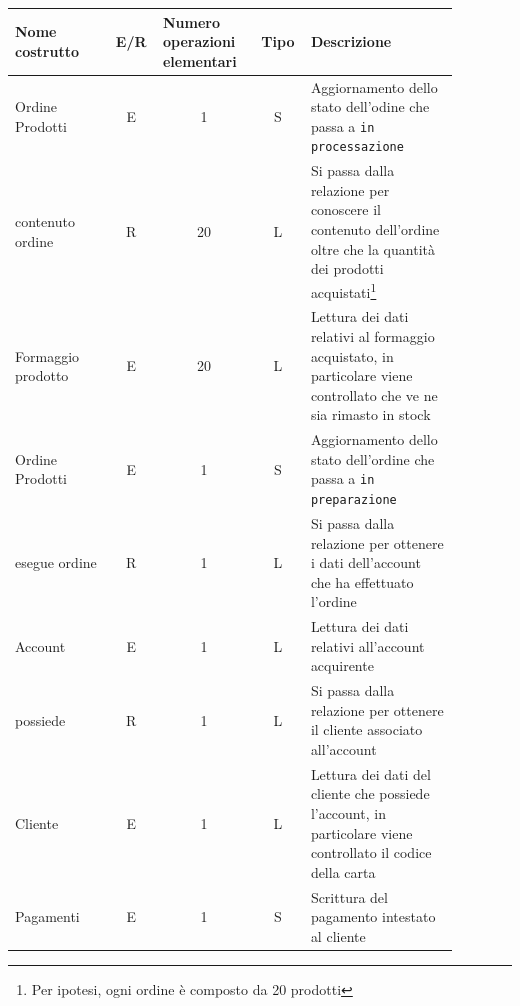 \documentclass[12pt,a4paper]{article}
\begin{document}
\begin{center}\setlength{\extrarowheight}{1.5pt}\begin{longtable}{|p{0.2\linewidth}|p{0.1\linewidth}|p{0.175\linewidth}|p{0.1\linewidth}|p{0.3\linewidth}|}\hline \textbf{Nome costrutto}   & \multicolumn{1}{|c|}{\textbf{E/R}} & \textbf{Numero operazioni elementari} & \multicolumn{1}{|c|}{\textbf{Tipo}} & \textbf{Descrizione}\\ 
\hline
Ordine Prodotti
 & 
\multicolumn{1}{|c|}{E}
 & 
\multicolumn{1}{|c|}{1}
 & 
\multicolumn{1}{|c|}{S}
 & 
Aggiornamento dello stato dell'odine che passa a \texttt{in processazione}
\\
\hline
contenuto ordine
 & 
\multicolumn{1}{|c|}{R}
 & 
\multicolumn{1}{|c|}{20}
 & 
\multicolumn{1}{|c|}{L}
 & 
Si passa dalla relazione per conoscere il contenuto dell'ordine oltre che la quantità dei prodotti acquistati\footnote{Per ipotesi, ogni ordine è composto da 20 prodotti}
\\
\hline
Formaggio prodotto
 & 
\multicolumn{1}{|c|}{E}
 & 
\multicolumn{1}{|c|}{20}
 & 
\multicolumn{1}{|c|}{L}
 & 
Lettura dei dati relativi al formaggio acquistato, in particolare viene controllato che ve ne sia rimasto in stock
\\
\hline
Ordine Prodotti
 & 
\multicolumn{1}{|c|}{E}
 & 
\multicolumn{1}{|c|}{1}
 & 
\multicolumn{1}{|c|}{S}
 & 
Aggiornamento dello stato dell'ordine che passa a \texttt{in preparazione}
\\
\hline
esegue ordine
 & 
\multicolumn{1}{|c|}{R}
 & 
\multicolumn{1}{|c|}{1}
 & 
\multicolumn{1}{|c|}{L}
 & 
Si passa dalla relazione per ottenere i dati dell'account che ha effettuato l'ordine
\\
\hline
Account
 & 
\multicolumn{1}{|c|}{E}
 & 
\multicolumn{1}{|c|}{1}
 & 
\multicolumn{1}{|c|}{L}
 & 
Lettura dei dati relativi all'account acquirente
\\
\hline
possiede
 & 
\multicolumn{1}{|c|}{R}
 & 
\multicolumn{1}{|c|}{1}
 & 
\multicolumn{1}{|c|}{L}
 & 
Si passa dalla relazione per ottenere il cliente associato all'account
\\
\hline
Cliente
 & 
\multicolumn{1}{|c|}{E}
 & 
\multicolumn{1}{|c|}{1}
 & 
\multicolumn{1}{|c|}{L}
 & 
Lettura dei dati del cliente che possiede l'account, in particolare viene controllato il codice della carta
\\
\hline
Pagamenti
 & 
\multicolumn{1}{|c|}{E}
 & 
\multicolumn{1}{|c|}{1}
 & 
\multicolumn{1}{|c|}{S}
 & 
Scrittura del pagamento intestato al cliente
\\

\end{longtable}
\end{center}
\end{document}
